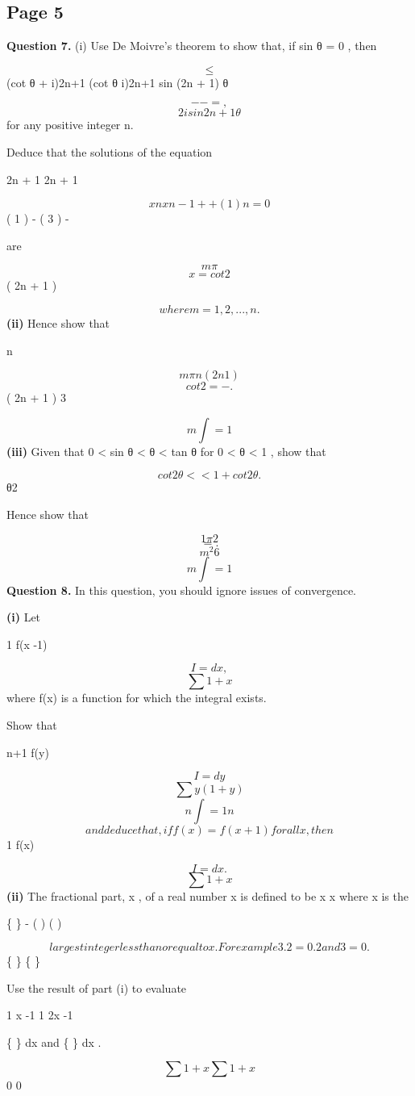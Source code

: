 \documentclass[12pt]{article}
\begin{document}
\subsection*{Page 5}
\begin{flushleft}
\bigskip\textbf{Question 7.} (i) Use De Moivre's theorem to show that, if sin θ = 0 , then\par
\[\leq\]
(cot θ + i)2n+1 (cot θ i)2n+1 sin (2n + 1) θ\par
\[- - = ,\]
\[2i sin2n+1 θ\]
for any positive integer n.\par
Deduce that the solutions of the equation\par
2n + 1 2n + 1\par
\[xn xn-1 + + ( 1)n = 0\]
( 1 ) - ( 3 ) \cdots -\par
are\par
\[m\pi\]
\[x = cot2\]
( 2n + 1 )\par
\[where m = 1, 2, . . . , n .\]
\textbf{(ii)} Hence show that\par
n\par
\[m\pi n (2n 1)\]
\[cot2 = - .\]
( 2n + 1 ) 3\par
\[m\int=1\]
\textbf{(iii)} Given that 0 < sin θ < θ < tan θ for 0 < θ < 1 \pi, show that\par
\[cot2 θ < < 1 + cot2 θ.\]
θ2\par
Hence show that\par
\infty\par
\[1 \pi2\]
\[= .\]
\[m^2 6\]
\[m\int=1\]
\bigskip\textbf{Question 8.} In this question, you should ignore issues of convergence.\par
\textbf{(i)} Let\par
1 f(x -1)\par
\[I = dx ,\]
\[\sum 1 + x\]
where f(x) is a function for which the integral exists.\par
Show that\par
\infty\par
n+1 f(y)\par
\[I = dy\]
\[\sum y(1 + y)\]
\[n\int=1 n\]
\[and deduce that, if f(x) = f(x + 1) for all x, then\]
1 f(x)\par
\[I = dx .\]
\[\sum 1 + x\]
\textbf{(ii)} The fractional part, x , of a real number x is defined to be x x where x is the\par
\{ \} - ( ) ( )\par
\[largest integer less than or equal to x. For example 3.2 = 0.2 and 3 = 0 .\]
\{ \} \{ \}\par
Use the result of part (i) to evaluate\par
1 x -1 1 2x -1\par
\{ \} dx and \{ \} dx .\par
\[\sum 1 + x \sum 1 + x\]
0 0\par
\end{flushleft}
\end{document}
